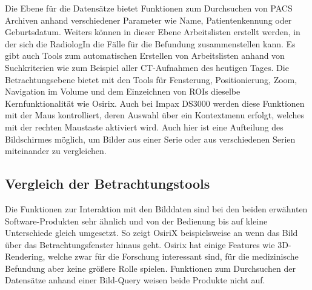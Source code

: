 %
Die Ebene für die Datensätze bietet Funktionen zum Durchsuchen von PACS Archiven anhand verschiedener Parameter wie Name, Patientenkennung oder Geburtsdatum.
Weiters können in dieser Ebene Arbeitslisten erstellt werden, in der sich die RadiologIn die Fälle für die Befundung zusammenstellen kann.
Es gibt auch Tools zum automatischen Erstellen von Arbeitslisten anhand von Suchkriterien wie zum Beispiel aller CT-Aufnahmen des heutigen Tages.
%
Die Betrachtungsebene bietet mit den Tools für Fensterung, Positionierung, Zoom, Navigation im Volume und dem Einzeichnen von ROIs dieselbe Kernfunktionalität wie Osirix.
Auch bei Impax DS3000 werden diese Funktionen mit der Maus kontrolliert, deren Auswahl über ein Kontextmenu erfolgt, welches mit der rechten Maustaste aktiviert wird.
Auch hier ist eine Aufteilung des Bildschirmes möglich, 
um Bilder aus einer Serie oder aus verschiedenen Serien miteinander zu vergleichen.


\subsection{Vergleich der Betrachtungstools}
\label{sec:Vergleich der Betrachtungstools}
Die Funktionen zur Interaktion mit den Bilddaten sind bei den beiden erwähnten Software-Produkten sehr ähnlich und von der Bedienung bis auf kleine Unterschiede gleich umgesetzt.
So zeigt OsiriX beispielsweise an wenn das Bild über das Betrachtungsfenster hinaus geht.
Osirix hat einige Features wie 3D-Rendering, welche zwar für die Forschung interessant sind, für die medizinische Befundung aber keine größere Rolle spielen.
Funktionen zum Durchsuchen der Datensätze anhand einer Bild-Query weisen beide Produkte nicht auf.

